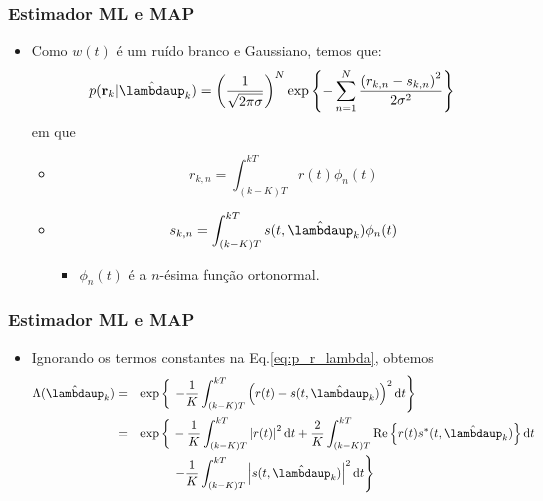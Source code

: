 \begin{frame}[t]
    \frametitle{Estimador ML e MAP}
    \begin{itemize}
        \item Como \(w(t)\) é um ruído branco e Gaussiano, temos que:
        \begin{align}
            p(\mathbf{r}_k | \hat{\boldsymbol{\lambdaup}}_k) = \left( \frac{1}{\sqrt{2\pi \sigma}} \right)^{N} \text{exp}\left\{ - \sum_{n = 1}^{N} \frac{\left(r_{k,n} - s_{k,n}\right)^{2}}{2\sigma^{2}} \right\}
            \label{eq:p_r_lambda}
        \end{align}
        em que
        \begin{itemize}
            \item \[r_{k,n} = \int_{(k-K)T}^{kT} r(t) \phi_n (t) \]
            \item \[s_{k,n} = \int_{(k-K)T}^{kT} s(t, \hat{\boldsymbol{\lambdaup}}_{k}) \phi_n (t) \]
            \begin{itemize}
                \item \(\phi_n (t)\) é a \(n\)-ésima função ortonormal.
            \end{itemize}
        \end{itemize}
    \end{itemize}
\end{frame}

\begin{frame}[t]
    \frametitle{Estimador ML e MAP}

    \begin{itemize}
        \item Ignorando os termos constantes na Eq.\eqref{eq:p_r_lambda}, obtemos
        \begin{align}
            \Lambda(\hat{\boldsymbol{\lambdaup}}_{k}) & = & \textnormal{exp} \left\{ \sizecorr{\frac{1}{K}}\right. & \left. - \frac{1}{K} \int_{(k-K)T}^{kT} \left( r(t) - s(t, \hat{\boldsymbol{\lambdaup}}_{k}) \right)^{2} \diff{t} \right\} \nonumber \\
            & = & \textnormal{exp}\left\{ \sizecorr{\frac{1}{K}}\right. & - \frac{1}{K} \int_{(k-K)T}^{kT} \abs{r(t)}^{2} \diff{t} + \frac{2}{K} \int_{(k-K)T}^{kT} \textnormal{Re}\left\{r(t)s^*(t, \hat{\boldsymbol{\lambdaup}}_{k})\right\} \diff{t}  \nonumber \\
            &&& \left. - \frac{1}{K} \int_{(k-K)T}^{kT} \abs{s(t, \hat{\boldsymbol{\lambdaup}}_{k})}^{2} \diff{t} \right\}
        \end{align}
    \end{itemize}
\end{frame}

